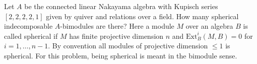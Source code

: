 Let $A$ be the connected linear Nakayama algebra with Kupisch series $[2,2,2,2,1]$ given by quiver and relations over a field. How many spherical indecomposable $A$-bimodules are there? Here a module $M$ over an algebra $B$ is called spherical if $M$ has finite projective dimension $n$ and $\mathrm{Ext}_B^i(M,B)=0$ for $i=1,\dots,n-1$. By convention all modules of projective dimension $\leq 1$ is spherical. For this problem, being spherical is meant in the bimodule sense.

